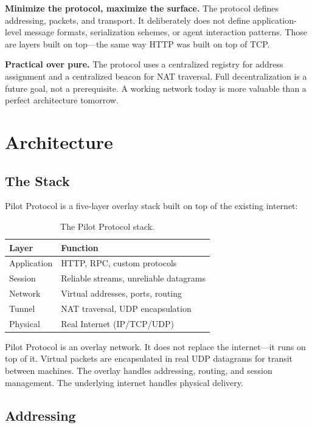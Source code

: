 \documentclass[11pt,a4paper]{article}
\begin{document}
\textbf{Minimize the protocol, maximize the surface.} The protocol defines addressing, packets, and transport. It deliberately does not define application-level message formats, serialization schemes, or agent interaction patterns. Those are layers built on top---the same way HTTP was built on top of TCP.

\textbf{Practical over pure.} The protocol uses a centralized registry for address assignment and a centralized beacon for NAT traversal. Full decentralization is a future goal, not a prerequisite. A working network today is more valuable than a perfect architecture tomorrow.

\section{Architecture}

\subsection{The Stack}

Pilot Protocol is a five-layer overlay stack built on top of the existing internet:

\begin{table}[h]
\centering
\begin{tabular}{@{}ll@{}}
\toprule
\textbf{Layer} & \textbf{Function} \\
\midrule
Application     & HTTP, RPC, custom protocols \\
Session         & Reliable streams, unreliable datagrams \\
Network         & Virtual addresses, ports, routing \\
Tunnel          & NAT traversal, UDP encapsulation \\
Physical        & Real Internet (IP/TCP/UDP) \\
\bottomrule
\end{tabular}
\caption{The Pilot Protocol stack.}
\label{tab:stack}
\end{table}

Pilot Protocol is an overlay network. It does not replace the internet---it runs on top of it. Virtual packets are encapsulated in real UDP datagrams for transit between machines. The overlay handles addressing, routing, and session management. The underlying internet handles physical delivery.

\subsection{Addressing}
\end{document}
